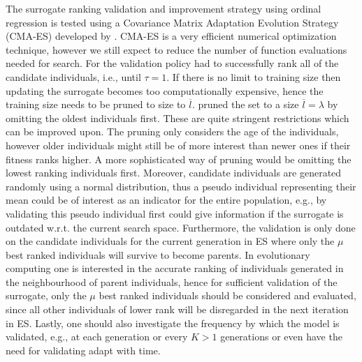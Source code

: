 The surrogate ranking validation and improvement strategy using ordinal regression is tested using a Covariance Matrix Adaptation Evolution Strategy (CMA-ES) developed by \cite{Hansen01}. CMA-ES is a very efficient numerical optimization technique, however we still expect to reduce the number of function evaluations needed for search. For \cite{Ru06:PPSN} the validation policy had to successfully rank all of the candidate individuals, i.e.,  until $\tau=1$. %
If there is no limit to training size then updating the surrogate becomes too computationally expensive, hence the training size needs to be pruned to size to $\overline{l}$. %
\citeauthor{Ru06:PPSN} pruned the set to a size $\overline{l} = \lambda$ by omitting the oldest individuals first. These are quite stringent restrictions which can be improved upon. 
The pruning only considers the age of the individuals, however older individuals might still be of more interest than newer ones if their fitness ranks higher. A more sophisticated way of pruning would be omitting the lowest ranking individuals first. 
Moreover, candidate individuals are generated randomly using a normal distribution, thus a pseudo individual representing their mean could be of interest as an indicator for the entire population, e.g., by validating this pseudo individual first could give information if the surrogate is outdated w.r.t. the current search space. 
Furthermore, the validation is only done on the candidate individuals for the current generation in ES where only the $\mu$ best ranked individuals will survive to become parents. In evolutionary computing one is interested in the accurate ranking of individuals  generated in the neighbourhood of parent individuals, hence for sufficient validation of the surrogate, only the $\mu$ best ranked individuals  should be considered and evaluated, since all other individuals  of lower rank will be disregarded in the next iteration in ES. 
Lastly, one should also investigate the frequency by which the model is validated, e.g., at each generation or every $K>1$ generations or even have the need for validating adapt with time.

